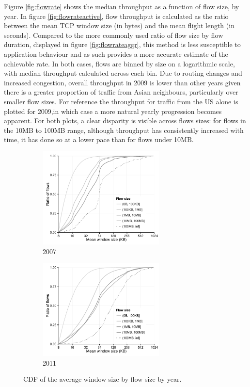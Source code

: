 Figure \ref{fig:flowrate} shows the median throughput as a function of flow size, by year.
In figure \ref{fig:flowrateactive}, flow throughput is calculated as the ratio between the mean \ac{TCP} window size (in bytes) and the mean flight length (in seconds).
Compared to the more commonly used ratio of flow size by flow duration, displayed in figure \ref{fig:flowrateaggr}, this method is less susceptible to application behaviour and as such provides a more accurate estimate of the achievable rate.
In both cases, flows are binned by size on a logarithmic scale, with median throughput calculated across each bin.
Due to routing changes and increased congestion, overall throughput in 2009 is lower than other years given there is a greater proportion of traffic from Asian neighbours, particularly over smaller flow sizes.
For reference the throughput for traffic from the US alone is plotted for 2009,in which case a more natural yearly progression becomes apparent.
For both plots, a clear disparity is visible across flows sizes: for flows in the 10MB to 100MB range, although throughput has consistently increased with time, it has done so at a lower pace than for flows under 10MB. 

\begin{figure}
    \begin{subfigure}[b]{.5\linewidth}
        \centering
        \includegraphics[width=2.5in]{figures/malawi/windowsize2007}
        \caption{2007}
    \end{subfigure}%
    \begin{subfigure}[b]{.5\linewidth}
        \centering
        \includegraphics[width=2.5in]{figures/malawi/windowsize2011}
        \caption{2011}
    \end{subfigure}%
    \caption{CDF of the average window size by flow size by year. \label{fig:windowsize}}
\end{figure}
 
